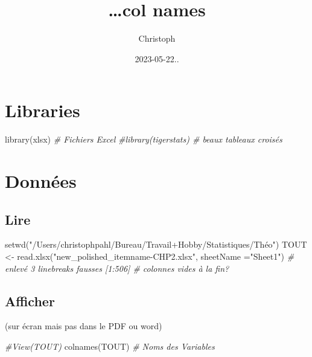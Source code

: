 \documentclass[
]{article}
\title{\ldots col names}
\author{Christoph}
\date{2023-05-22..}
\newenvironment{Shaded}{\begin{snugshade}}{\end{snugshade}}
\newcommand{\AttributeTok}[1]{\textcolor[rgb]{0.77,0.63,0.00}{#1}}
\newcommand{\CommentTok}[1]{\textcolor[rgb]{0.56,0.35,0.01}{\textit{#1}}}
\newcommand{\FunctionTok}[1]{\textcolor[rgb]{0.00,0.00,0.00}{#1}}
\newcommand{\NormalTok}[1]{#1}
\newcommand{\OtherTok}[1]{\textcolor[rgb]{0.56,0.35,0.01}{#1}}
\newcommand{\StringTok}[1]{\textcolor[rgb]{0.31,0.60,0.02}{#1}}
\begin{document}
\maketitle

\hypertarget{libraries}{%
\section{Libraries}\label{libraries}}

\begin{Shaded}
\begin{Highlighting}[]
\FunctionTok{library}\NormalTok{(xlsx)                                         }\CommentTok{\# Fichiers Excel}
\CommentTok{\#library(tigerstats)                                   \# beaux tableaux croisés}
\end{Highlighting}
\end{Shaded}

\hypertarget{donnuxe9es}{%
\section{Données}\label{donnuxe9es}}

\hypertarget{lire}{%
\subsection{Lire}\label{lire}}

\begin{Shaded}
\begin{Highlighting}[]
\FunctionTok{setwd}\NormalTok{(}\StringTok{"/Users/christophpahl/Bureau/Travail+Hobby/Statistiques/Théo"}\NormalTok{)}
\NormalTok{TOUT }\OtherTok{\textless{}{-}} \FunctionTok{read.xlsx}\NormalTok{(}\StringTok{"new\_polished\_itemname{-}CHP2.xlsx"}\NormalTok{, }\AttributeTok{sheetName =}\StringTok{"Sheet1"}\NormalTok{)  }\CommentTok{\# enlevé 3 linebreaks fausses     [1:506]  \# colonnes vides à la fin?}
\end{Highlighting}
\end{Shaded}

\hypertarget{afficher}{%
\subsection{Afficher}\label{afficher}}

(sur écran mais pas dans le PDF ou word)

\begin{Shaded}
\begin{Highlighting}[]
\CommentTok{\#View(TOUT)}
\FunctionTok{colnames}\NormalTok{(TOUT)   }\CommentTok{\# Noms des Variables}
\end{Highlighting}
\end{Shaded}
\end{document}
